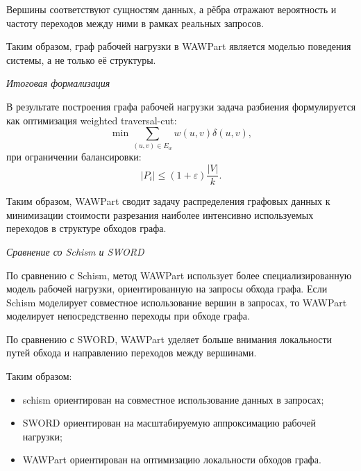 Вершины соответствуют сущностям данных, а рёбра отражают вероятность и частоту переходов между ними в рамках реальных запросов.

Таким образом, граф рабочей нагрузки в WAWPart является моделью поведения системы, а не только её структуры.

\textit{Итоговая формализация}

В результате построения графа рабочей нагрузки задача разбиения формулируется как оптимизация weighted traversal-cut:
\begin{equation*}
\min \sum_{(u,v)\in E_w} w(u,v)\delta(u,v),
\end{equation*}
при ограничении балансировки:
\begin{equation*}
|P_i| \leq (1+\varepsilon)\frac{|V|}{k}.
\end{equation*}

Таким образом, WAWPart сводит задачу распределения графовых данных к минимизации стоимости разрезания наиболее интенсивно используемых переходов в структуре обходов графа.

\textit{Сравнение со Schism и SWORD}

По сравнению с Schism, метод WAWPart использует более специализированную модель рабочей нагрузки, ориентированную на запросы обхода графа. Если Schism моделирует совместное использование вершин в запросах, то WAWPart моделирует непосредственно переходы при обходе графа.

По сравнению с SWORD, WAWPart уделяет больше внимания локальности путей обхода и направлению переходов между вершинами.

Таким образом:
\begin{itemize}
    \item schism ориентирован на совместное использование данных в запросах;
    \item SWORD ориентирован на масштабируемую аппроксимацию рабочей нагрузки;
    \item WAWPart ориентирован на оптимизацию локальности обходов графа.
\end{itemize}
